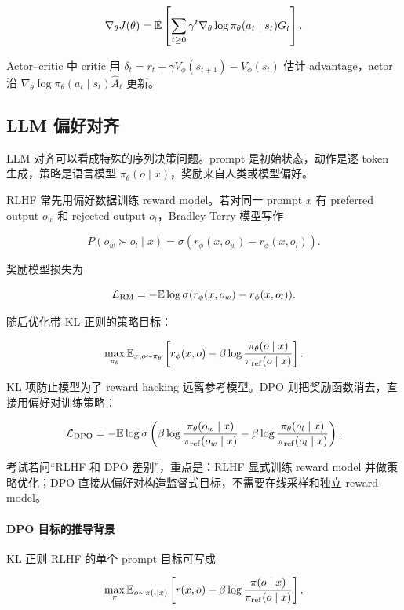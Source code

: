 \documentclass[11pt]{ctexart}
\begin{document}
\[
  \nabla_\theta J(\theta)=\mathbb{E}\left[\sum_{t\ge0}\gamma^t\nabla_\theta\log\pi_\theta(a_t\mid s_t)G_t\right].
\]

Actor--critic 中 critic 用 \(\delta_t=r_t+\gamma V_\phi(s_{t+1})-V_\phi(s_t)\) 估计 advantage，actor 沿 \(\nabla_\theta\log\pi_\theta(a_t\mid s_t)\widehat A_t\) 更新。

\subsection{LLM 偏好对齐}


LLM 对齐可以看成特殊的序列决策问题。prompt 是初始状态，动作是逐 token 生成，策略是语言模型 \(\pi_\theta(o\mid x)\)，奖励来自人类或模型偏好。

RLHF 常先用偏好数据训练 reward model。若对同一 prompt \(x\) 有 preferred output \(o_w\) 和 rejected output \(o_l\)，Bradley-Terry 模型写作

\[
  P(o_w\succ o_l\mid x)
  =
  \sigma(r_\phi(x,o_w)-r_\phi(x,o_l)).
\]

奖励模型损失为

\[
  \mathcal{L}_{\mathrm{RM}}
  =
  -
  \mathbb{E}
  \log
  \sigma(r_\phi(x,o_w)-r_\phi(x,o_l)).
\]

随后优化带 KL 正则的策略目标：

\[
  \max_{\pi_\theta}
  \mathbb{E}_{x,o\sim\pi_\theta}
  \left[
    r_\phi(x,o)
    -
    \beta
    \log
    \frac{\pi_\theta(o\mid x)}{\pi_{\mathrm{ref}}(o\mid x)}
  \right].
\]

KL 项防止模型为了 reward hacking 远离参考模型。DPO 则把奖励函数消去，直接用偏好对训练策略：

\[
  \mathcal{L}_{\mathrm{DPO}}
  =
  -
  \mathbb{E}
  \log
  \sigma
  \left(
    \beta
    \log
    \frac{\pi_\theta(o_w\mid x)}{\pi_{\mathrm{ref}}(o_w\mid x)}
    -
    \beta
    \log
    \frac{\pi_\theta(o_l\mid x)}{\pi_{\mathrm{ref}}(o_l\mid x)}
  \right).
\]

考试若问“RLHF 和 DPO 差别”，重点是：RLHF 显式训练 reward model 并做策略优化；DPO 直接从偏好对构造监督式目标，不需要在线采样和独立 reward model。

\paragraph{DPO 目标的推导背景}

KL 正则 RLHF 的单个 prompt 目标可写成

\[
  \max_{\pi}
  \mathbb{E}_{o\sim\pi(\cdot\mid x)}
  \left[
    r(x,o)
    -
    \beta
    \log
    \frac{\pi(o\mid x)}{\pi_{\mathrm{ref}}(o\mid x)}
  \right].
\]
\end{document}
